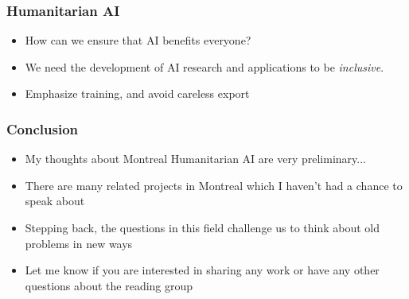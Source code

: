 \documentclass[10pt,mathserif]{beamer}
\begin{document}
\begin{frame}
  \frametitle{Humanitarian AI}
  \begin{itemize}
  \item How can we ensure that AI benefits everyone?
  \item We need the development of AI research and applications to be
    \textit{inclusive}.
  \item Emphasize training, and avoid careless export
  \end{itemize}
\end{frame}

\begin{frame}
  \frametitle{Conclusion}
  \begin{itemize}
  \item My thoughts about Montreal Humanitarian AI are very preliminary...
  \item There are many related projects in Montreal which I haven't had a chance
    to speak about
  \item Stepping back, the questions in this field challenge us to think about
    old problems in new ways
  \item Let me know if you are interested in sharing any work or have any other
    questions about the reading group
  \end{itemize}
\end{frame}
\end{document}
